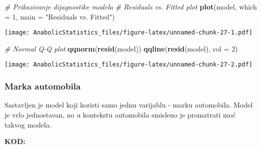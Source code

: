 \documentclass[
]{article}
\newenvironment{Shaded}{\begin{snugshade}}{\end{snugshade}}
\newcommand{\AttributeTok}[1]{\textcolor[rgb]{0.13,0.29,0.53}{#1}}
\newcommand{\CommentTok}[1]{\textcolor[rgb]{0.56,0.35,0.01}{\textit{#1}}}
\newcommand{\DecValTok}[1]{\textcolor[rgb]{0.00,0.00,0.81}{#1}}
\newcommand{\FunctionTok}[1]{\textcolor[rgb]{0.13,0.29,0.53}{\textbf{#1}}}
\newcommand{\NormalTok}[1]{#1}
\newcommand{\OtherTok}[1]{\textcolor[rgb]{0.56,0.35,0.01}{#1}}
\newcommand{\SpecialCharTok}[1]{\textcolor[rgb]{0.81,0.36,0.00}{\textbf{#1}}}
\newcommand{\StringTok}[1]{\textcolor[rgb]{0.31,0.60,0.02}{#1}}
\begin{document}
\begin{Shaded}
\begin{Highlighting}[]
\CommentTok{\# Prikazivanje dijagnostike modela}
\CommentTok{\# Residuals vs. Fitted plot}
\FunctionTok{plot}\NormalTok{(model, }\AttributeTok{which =} \DecValTok{1}\NormalTok{, }\AttributeTok{main =} \StringTok{"Residuals vs. Fitted"}\NormalTok{)}
\end{Highlighting}
\end{Shaded}

\texttt{[image: AnabolicStatistics\_files/figure-latex/unnamed-chunk-27-1.pdf]}

\begin{Shaded}
\begin{Highlighting}[]
\CommentTok{\# Normal Q{-}Q plot}
\FunctionTok{qqnorm}\NormalTok{(}\FunctionTok{resid}\NormalTok{(model))}
\FunctionTok{qqline}\NormalTok{(}\FunctionTok{resid}\NormalTok{(model), }\AttributeTok{col =} \DecValTok{2}\NormalTok{)}
\end{Highlighting}
\end{Shaded}

\texttt{[image: AnabolicStatistics\_files/figure-latex/unnamed-chunk-27-2.pdf]}

\subsubsection{Marka automobila}\label{marka-automobila}

Sastavljen je model koji koristi samo jednu varijablu - marku
automobila. Model je vrlo jednostavan, no u kontekstu automobila
smisleno je promatrati moć takvog modela.

\textbf{KOD:}

\begin{Shaded}
\end{Shaded}
\end{document}
